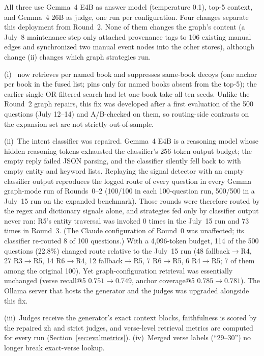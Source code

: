 All three use Gemma~4 E4B as answer model (temperature 0.1), top-5
context, and Gemma~4 26B as judge, one run per configuration. Four
changes separate this deployment from Round~2. None of them changes the
graph's content (a July~8 maintenance step only attached provenance tags
to 106 existing manual edges and synchronized two manual event nodes
into the other stores), although change (ii) changes which graph
strategies run.

(i)~ now retrieves per named book and suppresses
same-book decoys (one anchor per book in the fused list; pins only for
named books absent from the top-5); the earlier single OR-filtered
search had let one book take all ten seeds. Unlike the Round~2 graph
repairs, this fix was developed after a first evaluation of the 500
questions (July 12--14) and A/B-checked on them, so routing-side
contrasts on the expansion set are not strictly out-of-sample.

(ii)~The intent classifier was repaired. Gemma~4 E4B is a reasoning
model whose hidden reasoning tokens exhausted the classifier's 256-token
output budget; the empty reply failed JSON parsing, and the classifier
silently fell back to  with empty entity and keyword
lists. Replaying the signal detector with an empty classifier output
reproduces the logged route of every question in every Gemma graph-mode
run of Rounds~0--2 (100/100 in each 100-question run, 500/500 in a
July~15 run on the expanded benchmark). Those rounds were therefore
routed by the regex and dictionary signals alone, and strategies fed
only by classifier output never ran: R5's entity traversal was invoked
0 times in the July~15 run and 73 times in Round~3. (The Claude
configuration of Round~0 was unaffected; its classifier re-routed 8 of
100 questions.) With a 4{,}096-token budget, 114 of the 500 questions
(22.8\%) changed route relative to the July~15 run (48
fallback$\to$R4, 27 R3$\to$R5, 14 R6$\to$R4, 12 fallback$\to$R5, 7
R6$\to$R5, 6 R4$\to$R5; 7 of them among the original 100). Yet
graph-configuration retrieval was essentially unchanged (verse
recall@5 $0.751\to0.749$, anchor coverage@5 $0.785\to0.781$). The
Ollama server that hosts the generator and the judges was upgraded
alongside this fix.

 (iii)~Judges
receive the generator's exact
context blocks, faithfulness is scored by the repaired zh and strict
judges, and verse-level retrieval metrics are computed for every run
(Section~\ref{sec:evalmetrics}). (iv)~Merged verse labels (``29--30'')
no longer break exact-verse lookup.

